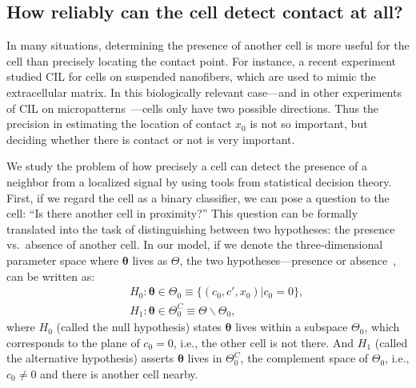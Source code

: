 \subsection{How reliably can the cell detect contact at all?}
\label{sec:ch5:detection}

In many situations, determining the presence of another cell is more useful for the cell than precisely locating the contact point.
For instance, a recent experiment~\cite{singh2021rules} studied CIL for cells on suspended nanofibers, which are used to mimic the extracellular matrix.
In this biologically relevant case---and in other experiments of CIL on micropatterns~\cite{desai2013contact, lin2015interplay}---cells only have two possible directions.
Thus the precision in estimating the location of contact $x_0$ is not so important, but deciding whether there is contact or not is very important.

We study the problem of how precisely a cell can detect the presence of a neighbor from a localized signal by using tools from statistical decision theory.
First, if we regard the cell as a binary classifier, we can pose a question to the cell: ``Is there another cell in proximity?''
This question can be formally translated into the task of distinguishing between two hypotheses: the presence vs.\ absence of another cell.
In our model, if we denote the three-dimensional parameter space where $\boldsymbol{\theta}$ lives as $\Theta$, the two hypotheses---presence or absence~\cite{mora2015physical, li2019graduate, lalanne2015chemodetection}, can be written as:
\begin{eqnarray}
&&H_0: \boldsymbol{\theta}\in\Theta_0\equiv\{(c_0,c',x_0)|c_0=0\},\\
&&H_1: \boldsymbol{\theta}\in\Theta_0^C\equiv\Theta\backslash\Theta_0,
\end{eqnarray}
where $H_0$ (called the null hypothesis) states $\boldsymbol{\theta}$ lives within a subspace $\Theta_0$, which corresponds to the plane of $c_0=0$, i.e., the other cell is not there.
And $H_1$ (called the alternative hypothesis) asserts $\boldsymbol{\theta}$ lives in $\Theta_0^C$, the complement space of $\Theta_0$, i.e., $c_0\neq 0$ and there is another cell nearby.

